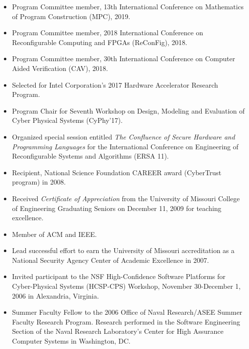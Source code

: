 \documentclass[11pt]{article}
\begin{document}
\begin{itemize}[leftmargin=0mm]

\item[] Program Committee member, 13th International Conference on
Mathematics of Program Construction (MPC), 2019.

\item[] Program Committee member, 2018 International Conference on Reconfigurable Computing and FPGAs (ReConFig), 2018.

\item[] Program Committee member, 30th International Conference on Computer Aided Verification (CAV), 2018.

\item[] Selected for Intel Corporation's 2017 Hardware Accelerator Research Program.

\item[] Program Chair for 
Seventh Workshop on Design, Modeling and Evaluation of Cyber Physical Systems (CyPhy'17).

\item[] Organized special session entitled \emph{The Confluence of Secure Hardware and Programming Languages} for the International Conference on 
Engineering of Reconfigurable Systems and Algorithms (ERSA 11).

\item[]  Recipient, National Science Foundation CAREER award (CyberTrust program) in 2008.

\item[] Received \emph{Certificate of Appreciation} from the University of Missouri College of Engineering Graduating Seniors on December 11, 2009 for teaching excellence.

\item[] Member of ACM and IEEE.

\item[] Lead successful effort to earn the University of Missouri accreditation as a National Security Agency Center of Academic Excellence in 2007. 

\item[] Invited participant to the NSF High-Confidence Software
  Platforms for Cyber-Physical Systems (HCSP-CPS) Workshop, November
  30-December 1, 2006 in Alexandria, Virginia.

\item[] Summer Faculty Fellow to the 2006 Office of Naval Research/ASEE
  Summer Faculty Research Program. Research performed in the Software
  Engineering Section of the Naval Research Laboratory's Center for
  High Assurance Computer Systems in Washington, DC. 


\end{itemize}
\end{document}
